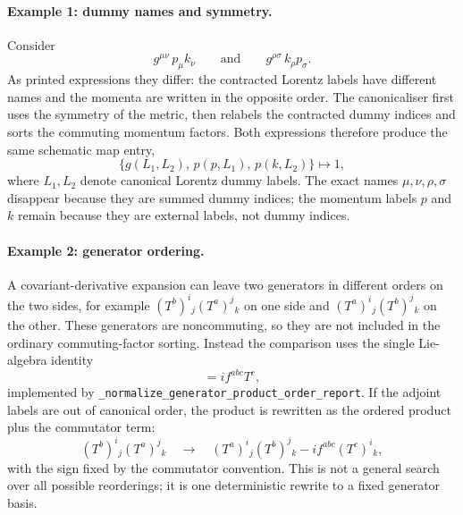\paragraph{Example 1: dummy names and symmetry.} Consider
\begin{equation}
    g^{\mu\nu}\, p_\mu k_\nu
    \qquad \text{and} \qquad
    g^{\rho\sigma}\, k_\rho p_\sigma .
    \label{eq:validation-metric-example}
\end{equation}
As printed expressions they differ: the contracted Lorentz labels have different names and the momenta are written in the opposite order. The canonicaliser first uses the symmetry of the metric, then relabels the contracted dummy indices and sorts the commuting momentum factors. Both expressions therefore produce the same schematic map entry,
\[
    \{g(L_1,L_2),\, p(p,L_1),\, p(k,L_2)\}
    \longmapsto 1 ,
\]
where $L_1,L_2$ denote canonical Lorentz dummy labels. The exact names $\mu,\nu,\rho,\sigma$ disappear because they are summed dummy indices; the momentum labels $p$ and $k$ remain because they are external labels, not dummy indices.

\paragraph{Example 2: generator ordering.} A covariant-derivative expansion can leave two generators in different orders on the two sides, for example $(T^b)^i{}_j(T^a)^j{}_k$ on one side and $(T^a)^i{}_j(T^b)^j{}_k$ on the other. These generators are noncommuting, so they are not included in the ordinary commuting-factor sorting. Instead the comparison uses the single Lie-algebra identity
\begin{equation}
    [T^a,T^b] = i f^{abc}T^c ,
    \label{eq:validation-commutator}
\end{equation}
implemented by \texttt{\_normalize\_generator\_product\_order\_report}. If the adjoint labels are out of canonical order, the product is rewritten as the ordered product plus the commutator term:
\[
    (T^b)^i{}_j(T^a)^j{}_k
    \quad \longrightarrow \quad
    (T^a)^i{}_j(T^b)^j{}_k - i f^{abc} (T^c)^i{}_k ,
\]
with the sign fixed by the commutator convention. This is not a general search over all possible reorderings; it is one deterministic rewrite to a fixed generator basis.

